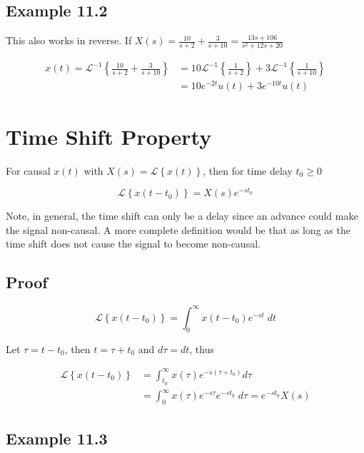 \documentclass{article}
\begin{document}
\subsection{Example 11.2}

This also works in reverse. If $X(s)=\frac{10}{s+2}+\frac{3}{s+10}=\frac{13 s+106}{s^{2}+12 s+20}$

$$
\begin{aligned}
x(t)=\mathcal{L}^{-1}\left\{\frac{10}{s+2}+\frac{3}{s+10}\right\} & =10 \mathcal{L}^{-1}\left\{\frac{1}{s+2}\right\}+3 \mathcal{L}^{-1}\left\{\frac{1}{s+10}\right\} \\
& =10 e^{-2 t} u(t)+3 e^{-10 t} u(t)
\end{aligned}
$$

\section{Time Shift Property}

For causal $x(t)$ with $X(s) = \mathcal{L}\left\{x(t)\right\}$, then for time delay $t_0 \geq 0$

\[
\mathcal{L}\left\{ x(t-t_0) \right\} = X(s) e^{-s t_0}
\]

Note, in general, the time shift can only be a delay since an advance could make the signal non-causal. A more complete definition would be that as long as the time shift does not cause the signal to become non-causal.

\subsection{Proof}

\[
\mathcal{L}\left\{x\left(t-t_{0}\right)\right\} =\int_{0}^{\infty} x\left(t-t_{0}\right) e^{-s t} \; dt
\]

Let $\tau = t-t_0$, then $t = \tau + t_0$ and $d\tau = dt$, thus

$$
\begin{aligned}
\mathcal{L}\left\{x\left(t-t_{0}\right)\right\} &= \int_{t_{0}}^{\infty} x(\tau) e^{-s\left(\tau+t_{0}\right)} d\tau\\
& =\int_{0}^{\infty} x(\tau) e^{-s \tau} e^{-s t_{0}} \; d\tau = e^{-s t_{0}} X(s)
\end{aligned}
$$

\subsection{Example 11.3}
\end{document}

